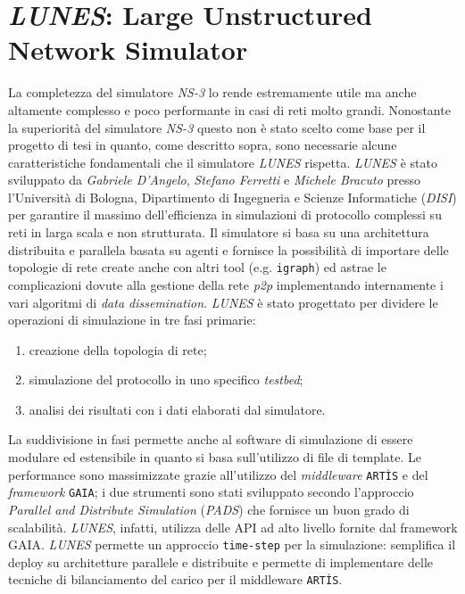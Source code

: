 \section{\textit{LUNES}: Large Unstructured Network Simulator}
La completezza del simulatore \textit{NS-3} lo rende estremamente utile ma anche altamente complesso e poco performante in casi di reti molto grandi.\newline
Nonostante la superiorità del simulatore \textit{NS-3} questo non è stato scelto come base per il progetto di tesi in quanto, come descritto sopra, sono necessarie alcune caratteristiche fondamentali che il simulatore \textit{LUNES} rispetta.\newline
\textit{LUNES}\cite{gdalunes} è stato sviluppato da \textit{Gabriele D'Angelo}, \textit{Stefano Ferretti} e \textit{Michele Bracuto} presso l'Università di Bologna, Dipartimento di Ingegneria e Scienze Informatiche (\textit{DISI}) per garantire il massimo dell'efficienza in simulazioni di protocollo complessi su reti in larga scala e non strutturata.\newline
Il simulatore si basa su una architettura distribuita e parallela basata su agenti e fornisce la possibilità di importare delle topologie di rete create anche con altri tool (e.g. \texttt{igraph}) ed astrae le complicazioni dovute alla gestione della rete \textit{p2p} implementando internamente i vari algoritmi di \textit{data dissemination}. \textit{LUNES} è stato progettato per dividere le operazioni di simulazione in tre fasi primarie:
\begin{enumerate}
    \item creazione della topologia di rete;
    \item simulazione del protocollo in uno specifico \textit{testbed};
    \item analisi dei risultati con i dati elaborati dal simulatore.
\end{enumerate}
La suddivisione in fasi permette anche al software di simulazione di essere modulare ed estensibile in quanto si basa sull'utilizzo di file di template. Le performance sono massimizzate grazie all'utilizzo del \textit{middleware} \texttt{ARTÌS} e del \textit{framework} \texttt{GAIA}; i due strumenti sono stati sviluppato secondo l'approccio \textit{Parallel and Distribute Simulation} (\textit{PADS}) che fornisce un buon grado di scalabilità. \textit{LUNES}, infatti, utilizza delle API ad alto livello fornite dal framework GAIA.
\textit{LUNES} permette un approccio \texttt{time-step} per la simulazione: semplifica il deploy su architetture parallele e distribuite e permette di implementare delle tecniche di bilanciamento del carico per il middleware \texttt{ARTÌS}.
